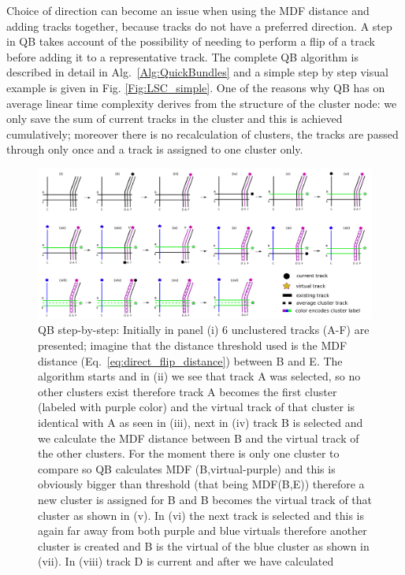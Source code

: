 \documentclass[preprint,authoryear,a4paper,10pt,onecolumn]{elsarticle}
\begin{document}
Choice of direction can become an issue when using the MDF distance and
adding tracks together, because tracks do not have a preferred
direction.  A step in QB takes account of the possibility of needing to
perform a flip of a track before adding it to a representative
track. The complete QB algorithm is described in detail in
Alg.~\ref{Alg:QuickBundles} and a simple step by step visual example is
given in Fig. \ref{Fig:LSC_simple}.  One of the reasons why QB has on
average linear time complexity derives from the structure of the cluster
node: we only save the sum of current tracks in the cluster and this is
achieved cumulatively; moreover there is no recalculation of clusters,
the tracks are passed through only once and a track is assigned to one
cluster only.

\begin{figure}
\includegraphics[scale=0.25]{last_figures/LSC_algorithm}
\caption{QB step-by-step: Initially in panel (i) 6 unclustered tracks
  (A-F) are presented; imagine that the distance threshold used is the
  MDF distance (Eq.~\ref{eq:direct_flip_distance}) between B and E. The
  algorithm starts and in (ii) we see that track A was selected, so no
  other clusters exist therefore track A becomes the first cluster
  (labeled with purple color) and the virtual track of that cluster is
  identical with A as seen in (iii), next in (iv) track B is selected
  and we calculate the MDF distance between B and the virtual track of
  the other clusters. For the moment there is only one cluster to
  compare so QB calculates MDF (B,virtual-purple) and this is obviously
  bigger than threshold (that being MDF(B,E)) therefore a new cluster is
  assigned for B and B becomes the virtual track of that cluster as
  shown in (v). In (vi) the next track is selected and this is again far
  away from both purple and blue virtuals therefore another cluster is
  created and B is the virtual of the blue cluster as shown in (vii).
  In (viii) track D is current and after we have calculated
}
\end{figure}
\end{document}
